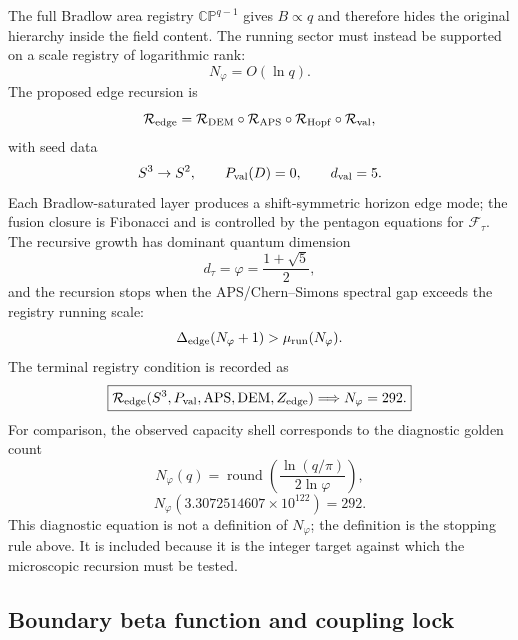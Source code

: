 \documentclass[aps,prd,reprint,nofootinbib,superscriptaddress,floatfix]{revtex4-2}
\numberwithin{equation}{section}
\theoremstyle{definition}
\theoremstyle{plain}
\begin{document}
The full Bradlow area registry \(\mathbb{CP}^{q-1}\) gives \(B\propto q\) and
therefore hides the original hierarchy inside the field content.  The running
sector must instead be supported on a scale registry of logarithmic rank:
\[
N_\varphi=O(\ln q).
\]
The proposed edge recursion is
\[
\mathcal R_{\rm edge}
=
\mathcal R_{\rm DEM}
\circ\mathcal R_{\rm APS}
\circ\mathcal R_{\rm Hopf}
\circ\mathcal R_{\rm val},
\]
with seed data
\[
S^3\rightarrow S^2,\qquad
P_{\rm val}(D)=0,\qquad d_{\rm val}=5 .
\]
Each Bradlow-saturated layer produces a shift-symmetric horizon edge mode; the
fusion closure is Fibonacci and is controlled by the pentagon equations for
\(\mathcal F_\tau\).  The recursive growth has dominant quantum dimension
\[
d_\tau=\varphi=\frac{1+\sqrt5}{2},
\]
and the recursion stops when the APS/Chern--Simons spectral gap exceeds the
registry running scale:
\[
\Delta_{\rm edge}(N_\varphi+1)>
\mu_{\rm run}(N_\varphi).
\]
The terminal registry condition is recorded as
\[
\boxed{
\mathcal R_{\rm edge}(S^3,P_{\rm val},{\rm APS},{\rm DEM},Z_{\rm edge})
\Longrightarrow N_\varphi=292 .
}
\]
For comparison, the observed capacity shell corresponds to the diagnostic
golden count
\[
N_\varphi(q)
=
\operatorname{round}
\left(
\frac{\ln(q/\pi)}{2\ln\varphi}
\right),
\]
\[
N_\varphi(3.3072514607\times10^{122})=292 .
\]
This diagnostic equation is not a definition of \(N_\varphi\); the definition
is the stopping rule above.  It is included because it is the integer target
against which the microscopic recursion must be tested.

\subsection{Boundary beta function and coupling lock}
\end{document}
